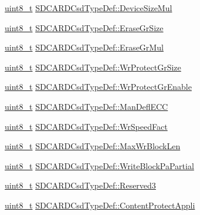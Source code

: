 \begin{DoxyCompactItemize}
\item 
\hyperlink{stdint_8h_aba7bc1797add20fe3efdf37ced1182c5}{uint8\-\_\-t} \hyperlink{group___p_i_o_s___s_d_c_a_r_d_gafcf009add5954b88bd7b13630179acd1}{S\-D\-C\-A\-R\-D\-Csd\-Type\-Def\-::\-Device\-Size\-Mul}
\item 
\hyperlink{stdint_8h_aba7bc1797add20fe3efdf37ced1182c5}{uint8\-\_\-t} \hyperlink{group___p_i_o_s___s_d_c_a_r_d_ga23248a27a48bd1603990d88bc6e6825b}{S\-D\-C\-A\-R\-D\-Csd\-Type\-Def\-::\-Erase\-Gr\-Size}
\item 
\hyperlink{stdint_8h_aba7bc1797add20fe3efdf37ced1182c5}{uint8\-\_\-t} \hyperlink{group___p_i_o_s___s_d_c_a_r_d_gaaba9c6de9483b08af94542e59c76107e}{S\-D\-C\-A\-R\-D\-Csd\-Type\-Def\-::\-Erase\-Gr\-Mul}
\item 
\hyperlink{stdint_8h_aba7bc1797add20fe3efdf37ced1182c5}{uint8\-\_\-t} \hyperlink{group___p_i_o_s___s_d_c_a_r_d_ga6976b49fb75de7273c9ae54e5b4df865}{S\-D\-C\-A\-R\-D\-Csd\-Type\-Def\-::\-Wr\-Protect\-Gr\-Size}
\item 
\hyperlink{stdint_8h_aba7bc1797add20fe3efdf37ced1182c5}{uint8\-\_\-t} \hyperlink{group___p_i_o_s___s_d_c_a_r_d_ga40ddea3e9a913588c57a8f922e929407}{S\-D\-C\-A\-R\-D\-Csd\-Type\-Def\-::\-Wr\-Protect\-Gr\-Enable}
\item 
\hyperlink{stdint_8h_aba7bc1797add20fe3efdf37ced1182c5}{uint8\-\_\-t} \hyperlink{group___p_i_o_s___s_d_c_a_r_d_ga638d0d0306f38092eba2d405639c2099}{S\-D\-C\-A\-R\-D\-Csd\-Type\-Def\-::\-Man\-Defl\-E\-C\-C}
\item 
\hyperlink{stdint_8h_aba7bc1797add20fe3efdf37ced1182c5}{uint8\-\_\-t} \hyperlink{group___p_i_o_s___s_d_c_a_r_d_gad518a80289b8949800c8f7e50fc4b21f}{S\-D\-C\-A\-R\-D\-Csd\-Type\-Def\-::\-Wr\-Speed\-Fact}
\item 
\hyperlink{stdint_8h_aba7bc1797add20fe3efdf37ced1182c5}{uint8\-\_\-t} \hyperlink{group___p_i_o_s___s_d_c_a_r_d_gac00127b98cb9a3a0e1a0bc7960570992}{S\-D\-C\-A\-R\-D\-Csd\-Type\-Def\-::\-Max\-Wr\-Block\-Len}
\item 
\hyperlink{stdint_8h_aba7bc1797add20fe3efdf37ced1182c5}{uint8\-\_\-t} \hyperlink{group___p_i_o_s___s_d_c_a_r_d_gaa2d30b075bc701aef9e50397db088180}{S\-D\-C\-A\-R\-D\-Csd\-Type\-Def\-::\-Write\-Block\-Pa\-Partial}
\item 
\hyperlink{stdint_8h_aba7bc1797add20fe3efdf37ced1182c5}{uint8\-\_\-t} \hyperlink{group___p_i_o_s___s_d_c_a_r_d_ga2912ee762425a05b026c2c66039b859b}{S\-D\-C\-A\-R\-D\-Csd\-Type\-Def\-::\-Reserved3}
\item 
\hyperlink{stdint_8h_aba7bc1797add20fe3efdf37ced1182c5}{uint8\-\_\-t} \hyperlink{group___p_i_o_s___s_d_c_a_r_d_ga0ff4eb4714ed988bfe5d6418f553dee3}{S\-D\-C\-A\-R\-D\-Csd\-Type\-Def\-::\-Content\-Protect\-Appli}

\end{DoxyCompactItemize}
